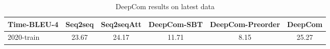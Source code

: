 

\begin{table*}
\begin{small}
\begin{center}
\caption{DeepCom results on latest data}
\begin{tabular}{l | c | c |c |c |c}
\toprule
 Time-BLEU-4
& Seq2seq
& Seq2seqAtt
& DeepCom-SBT
& DeepCom-Preorder
& DeepCom
\\
\midrule
2020-train
 & 23.67
 & 24.17
 & 11.71
 & 8.15
 & 25.27
\\
\bottomrule
\end{tabular}
\end{center}
\end{small}
\vspace{\TVDatasetMetrics}
\end{table*}